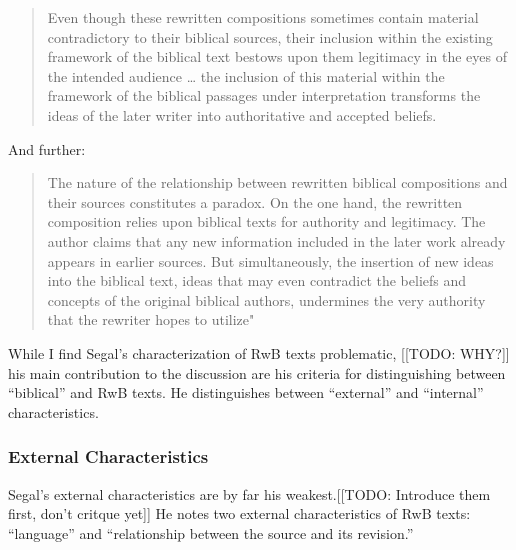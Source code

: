 \begin{quote}
    Even though these rewritten compositions sometimes contain material contradictory to their biblical sources, their inclusion within the existing framework of the biblical text bestows upon them legitimacy in the eyes of the intended audience \ldots{} the inclusion of this material within the framework of the biblical passages under interpretation transforms the ideas of the later writer into authoritative and accepted beliefs.\autocite[11]{segal_henze2005}
\end{quote} 

 And further: 

\begin{quote}
    The nature of the relationship between rewritten biblical compositions and their sources constitutes a paradox. On the one hand, the rewritten composition relies upon biblical texts for authority and legitimacy. The author claims that any new information included in the later work already appears in earlier sources. But simultaneously, the insertion of new ideas into the biblical text, ideas that may even contradict the beliefs and concepts of the original biblical authors, undermines the very authority that the rewriter hopes to utilize"\autocite[11-12]{segal_henze2005}
\end{quote} 

While I find Segal's characterization of RwB texts problematic, [[TODO: WHY?]] his main contribution to the discussion are his criteria for distinguishing between ``biblical'' and RwB texts. He distinguishes between ``external'' and ``internal'' characteristics. 

 \hypertarget{external-characteristics}{%
\subsubsection{External Characteristics}\label{external-characteristics}} 

Segal's external characteristics are by far his weakest.[[TODO: Introduce them first, don't critque yet]] He notes two external characteristics of RwB texts: ``language'' and ``relationship between the source and its revision.'' 

